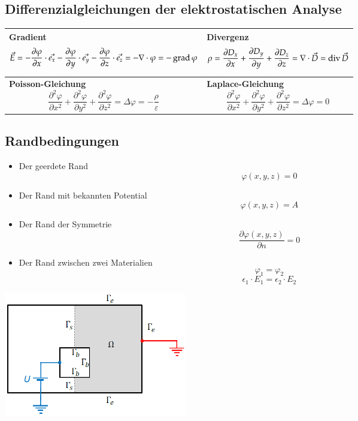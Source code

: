 \subsection{Differenzialgleichungen der elektrostatischen Analyse}
\begin{tabular}{|p{} |p{}|}
	\hline
	\textbf{Gradient}\newline
	\[ \vec{E}= - \dfrac{\partial\varphi}{\partial x} \cdot \vec{e_{x}} -  \dfrac{\partial\varphi}{\partial y} \cdot \vec{e_{y}}- \dfrac{\partial\varphi}{\partial z} \cdot \vec{e_{z}} = -\nabla \cdot \varphi = -\operatorname{grad} \varphi\]&
	\textbf{Divergenz}\newline
	\[ \rho= \dfrac{\partial D_{x}}{\partial x} +  \dfrac{\partial D_{y}}{\partial y} + \dfrac{\partial D_{z}}{\partial z}= \nabla \cdot \vec{D}= \operatorname{div} \vec{D} \]\\
	\hline
	\textbf{Poisson-Gleichung}\newline
	\[ \dfrac{\partial^2\varphi}{\partial x^2} +  \dfrac{\partial^2\varphi}{\partial y^2} + \dfrac{\partial^2\varphi}{\partial z^2} =\Delta \varphi = -\dfrac{\rho}{\varepsilon} \]&
	\textbf{Laplace-Gleichung}  \[ \dfrac{\partial^2\varphi}{\partial x^2} +  \dfrac{\partial^2\varphi}{\partial y^2} + \dfrac{\partial^2\varphi}{\partial z^2} =\Delta \varphi = 0 \]\\
	\hline
\end{tabular}
\subsection{Randbedingungen}
\begin{minipage}{8cm}
	\begin{itemize}
		\item Der geerdete Rand \[\varphi(x,y,z) = 0\]
		\item Der Rand mit bekannten Potential \[ \varphi(x,y,z) = A \]
		\item Der Rand der Symmetrie \[ \dfrac{\partial\varphi(x,y,z)}{\partial n} = 0\]
		\item Der Rand zwischen zwei Materialien \[\varphi_{1}=\varphi_{2}\]
		\[\epsilon_1 \cdot E_{1}=\epsilon_2 \cdot E_{2}\]
	\end{itemize}
\end{minipage}
\begin{minipage}{8cm}
	\includegraphics[width=8cm]{images/randbedinung_ES.png}
\end{minipage}
